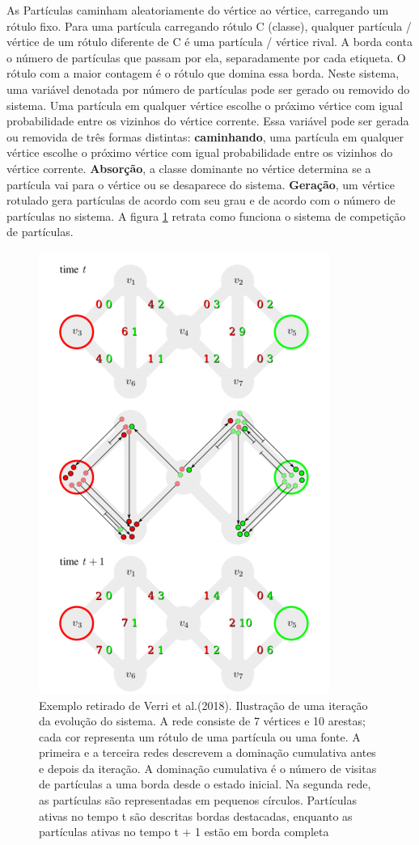 \documentclass[conference]{IEEEtran}
\begin{document}
As Partículas caminham aleatoriamente do vértice ao vértice, carregando um rótulo fixo. Para uma partícula carregando rótulo C (classe), qualquer partícula / vértice
de um rótulo diferente de C é uma partícula / vértice rival. A borda conta o número de partículas que passam por ela, separadamente por cada etiqueta. O rótulo com a maior contagem é o rótulo que domina essa borda. Neste sistema, uma variável denotada por número de partículas pode ser gerado ou removido do sistema. Uma partícula em qualquer vértice escolhe o próximo vértice com igual probabilidade entre os vizinhos do vértice corrente. Essa variável pode ser gerada ou removida de três formas distintas: \textbf{caminhando}, uma partícula em qualquer vértice escolhe o próximo vértice com igual probabilidade entre os vizinhos do vértice corrente. \textbf{Absorção}, a classe dominante no vértice determina se a partícula vai para o vértice ou se desaparece do sistema. \textbf{Geração},  um vértice rotulado gera partículas de acordo com seu grau e de acordo com o número de partículas no sistema. A figura \ref{fig2} retrata como funciona o sistema de competição de partículas.


\begin{figure}[htbp]
\centerline{\includegraphics[scale=0.5]{imagem_2.PNG}}
\caption{Exemplo retirado de Verri et al.(2018).
Ilustração de uma iteração da evolução do sistema. A rede consiste de 7 vértices e 10 arestas; cada cor representa um rótulo de uma partícula ou uma fonte. A primeira e a terceira redes descrevem a dominação cumulativa antes e depois da iteração. A dominação cumulativa é o número de visitas de partículas a uma borda desde o estado inicial. Na segunda rede,
as partículas são representadas em pequenos círculos. Partículas ativas no tempo t são descritas bordas destacadas, enquanto as partículas ativas no tempo t + 1 estão em borda completa}
\label{fig2}
\end{figure}
\end{document}
